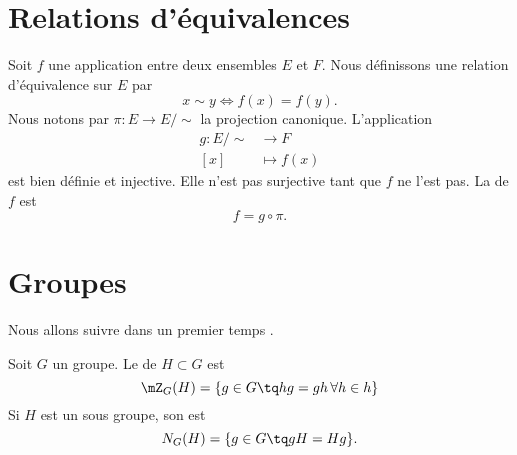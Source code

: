 
\section{Relations d'équivalences}

Soit \( f\) une application entre deux ensembles \( E\) et \( F\). Nous définissons une relation d'équivalence sur \( E\) par
\begin{equation}
    x\sim y\Leftrightarrow f(x)=f(y).
\end{equation}
Nous notons par \( \pi\colon E\to E/\sim\) la projection canonique. L'application
\begin{equation}
    \begin{aligned}
        g\colon E/\sim&\to F \\
        [x]&\mapsto f(x) 
    \end{aligned}
\end{equation}
est bien définie et injective. Elle n'est pas surjective tant que \( f\) ne l'est pas. La  de \( f\) est 
\begin{equation}
    f=g\circ\pi.
\end{equation}

\section{Groupes}

Nous allons suivre dans un premier temps \cite{Kropholler}.

\begin{definition}
    Soit \( G\) un groupe. Le  de \( H\subset G\) est 
    \begin{equation}
        \mZ_G(H)=\{ g\in G\tq hg=gh\,\forall h\in h\}
    \end{equation}
    Si \( H\) est un sous groupe, son  est
    \begin{equation}
        N_G(H)=\{ g\in G\tq gH=Hg \}.
    \end{equation}
\end{definition}

